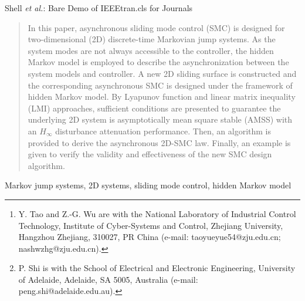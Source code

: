 \documentclass[journal,final,twocolumn]{IEEEtran}
\begin{document}

\author{Yue-Yue Tao, Zheng-Guang Wu, and Peng Shi
	\thanks{Y. Tao and Z.-G. Wu are with the National Laboratory of Industrial Control Technology, Institute of Cyber-Systems and Control, Zhejiang University, Hangzhou Zhejiang, 310027, PR China (e-mail: taoyueyue54@zju.edu.cn; nashwzhg@zju.edu.cn).}
	\thanks{P. Shi is with the School of Electrical and Electronic Engineering, University of Adelaide, Adelaide, SA 5005, Australia (e-mail: peng.shi@adelaide.edu.au). }  
}

%
{Shell \MakeLowercase{\textit{et al.}}: Bare Demo of IEEEtran.cls for Journals}

\maketitle



\begin{abstract}
	In this paper, asynchronous sliding mode control (SMC) is designed for two-dimensional (2D) discrete-time Markovian jump systems. As the system modes are not always accessible to the controller, the hidden Markov model is employed to describe the asynchronization between the system models and controller. A new 2D sliding surface is constructed and the corresponding asynchronous SMC is designed under the framework of hidden Markov model. By Lyapunov function and linear matrix inequality (LMI) approaches, sufficient conditions are presented to guarantee the underlying 2D system is asymptotically mean square stable (AMSS) with an $H_\infty$ disturbance attenuation performance. Then, an algorithm is provided to derive the asynchronous 2D-SMC law. Finally, an example is given to verify the validity and effectiveness of the new SMC design algorithm.
\end{abstract}


\begin{IEEEkeywords}
	Markov jump systems, 2D systems, sliding mode control, hidden Markov model
\end{IEEEkeywords}
\end{document}
